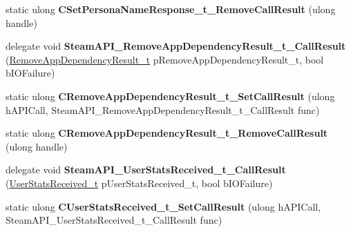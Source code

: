 \begin{DoxyCompactItemize}
\item 
\mbox{\label{class_valve_1_1_interop_1_1_native_entrypoints_aac79dec514068f93485abab55e66317d}} 
static ulong {\bfseries C\+Set\+Persona\+Name\+Response\+\_\+t\+\_\+\+Remove\+Call\+Result} (ulong handle)
\item 
\mbox{\label{class_valve_1_1_interop_1_1_native_entrypoints_a2326a5c0c7c304b1bc90c4482b90b0c2}} 
delegate void {\bfseries Steam\+A\+P\+I\+\_\+\+Remove\+App\+Dependency\+Result\+\_\+t\+\_\+\+Call\+Result} (\hyperlink{struct_valve_1_1_steamworks_1_1_remove_app_dependency_result__t}{Remove\+App\+Dependency\+Result\+\_\+t} p\+Remove\+App\+Dependency\+Result\+\_\+t, bool b\+I\+O\+Failure)
\item 
\mbox{\label{class_valve_1_1_interop_1_1_native_entrypoints_abce4523d0787fd4b8101a221798e0d6b}} 
static ulong {\bfseries C\+Remove\+App\+Dependency\+Result\+\_\+t\+\_\+\+Set\+Call\+Result} (ulong h\+A\+P\+I\+Call, Steam\+A\+P\+I\+\_\+\+Remove\+App\+Dependency\+Result\+\_\+t\+\_\+\+Call\+Result func)
\item 
\mbox{\label{class_valve_1_1_interop_1_1_native_entrypoints_a6439c8b1dce850b75bfb0bcec3f7e065}} 
static ulong {\bfseries C\+Remove\+App\+Dependency\+Result\+\_\+t\+\_\+\+Remove\+Call\+Result} (ulong handle)
\item 
\mbox{\label{class_valve_1_1_interop_1_1_native_entrypoints_a503d947bd7158c16c206108d67d4abf6}} 
delegate void {\bfseries Steam\+A\+P\+I\+\_\+\+User\+Stats\+Received\+\_\+t\+\_\+\+Call\+Result} (\hyperlink{struct_valve_1_1_steamworks_1_1_user_stats_received__t}{User\+Stats\+Received\+\_\+t} p\+User\+Stats\+Received\+\_\+t, bool b\+I\+O\+Failure)
\item 
\mbox{\label{class_valve_1_1_interop_1_1_native_entrypoints_aae96fbc2080e4a85c0e9a162d8dfe44f}} 
static ulong {\bfseries C\+User\+Stats\+Received\+\_\+t\+\_\+\+Set\+Call\+Result} (ulong h\+A\+P\+I\+Call, Steam\+A\+P\+I\+\_\+\+User\+Stats\+Received\+\_\+t\+\_\+\+Call\+Result func)
\item 

\end{DoxyCompactItemize}
